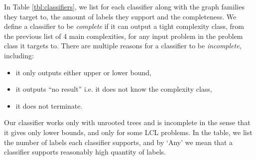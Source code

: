 In Table \ref{tbl:classifiers}, we list for each classifier along with the graph families they target to, the amount of labels they support and the completeness.
We define a classifier to be \emph{complete} if it can output a tight complexity class, from the previous list of 4 main complexities, for any input problem in the problem class it targets to.
There are multiple reasons for a classifier to be \emph{incomplete}, including:
\begin{itemize}
    \item it only outputs either upper or lower bound,
    \item it outputs ``no result'' i.e. it does not know the complexity class,
    \item it does not terminate.
\end{itemize}
Our classifier works only with unrooted trees and is incomplete in the sense that it gives only lower bounds, and only for some LCL problems.
In the table, we list the number of labels each classifier supports, and by `Any' we mean that a classifier supports reasonably high quantity of labels.
